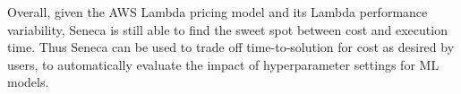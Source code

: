 Overall, given the AWS Lambda pricing model and its Lambda performance variability, 
Seneca is still able to find the sweet spot between cost 
and execution time. Thus Seneca can be used to trade off time-to-solution 
for cost as desired by users, to automatically evaluate the impact of hyperparameter settings for ML models.

